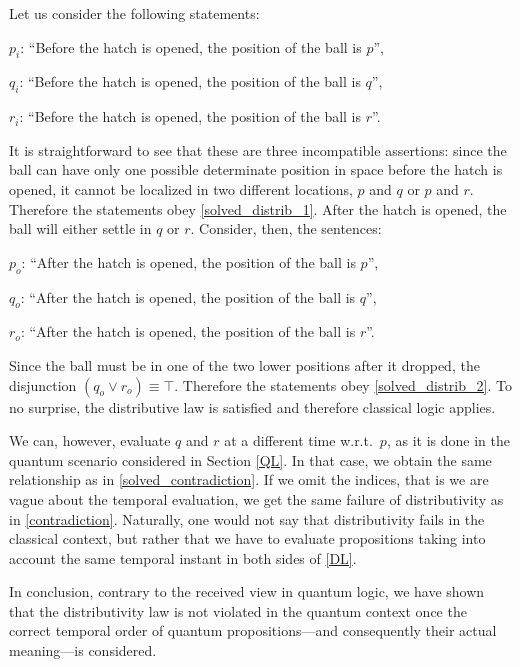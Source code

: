 \documentclass[11pt, executivepaper]{article}
\begin{document}
Let us consider the following statements:
\begin{description}
    \item $p_i$: ``Before the hatch is opened, the position of the ball is $p$'',
    \item $q_i$: ``Before the hatch is opened, the position of the ball is $q$'',
    \item $r_i$: ``Before the hatch is opened, the position of the ball is $r$''.
\end{description}
\noindent It is straightforward to see that these are three incompatible assertions: since the ball can have only one possible determinate position in space before the hatch is opened, it cannot be localized in two different locations, $p$ and $q$ or $p$ and $r$. Therefore the statements obey \eqref{solved_distrib_1}. After the hatch is opened, the ball will either settle in $q$ or $r$. Consider, then, the sentences:
\begin{description}
	\item $p_o$: ``After the hatch is opened, the position of the ball is $p$'',
	\item $q_o$: ``After the hatch is opened, the position of the ball is $q$'',
	\item $r_o$: ``After the hatch is opened, the position of the ball is $r$''.
\end{description}
Since the ball must be in one of the two lower positions after it dropped, the disjunction $(q_o \vee r_o) \equiv \top$. Therefore the statements obey \eqref{solved_distrib_2}. To no surprise, the distributive law is satisfied and therefore classical logic applies.

We can, however, evaluate $q$ and $r$ at a different time w.r.t.\ $p$, as it is done in the quantum scenario considered in Section \ref{QL}. In that case, we obtain the same relationship as in \eqref{solved_contradiction}. If we omit the indices, that is we are vague about the temporal evaluation, we get the same failure of distributivity as in \eqref{contradiction}. Naturally, one would not say that distributivity fails in the classical context, but rather that we have to evaluate propositions taking into account the same temporal instant in both sides of \eqref{DL}.

In conclusion, contrary to the received view in quantum logic, we have shown that the distributivity law is not violated in the quantum context once the correct temporal order of quantum propositions---and consequently their actual meaning---is considered.
\end{document}

